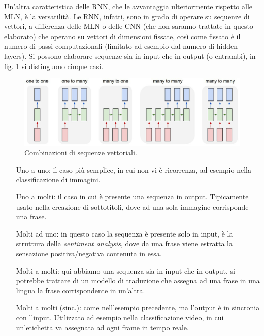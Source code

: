 Un'altra caratteristica delle RNN, che le avvantaggia ulteriormente rispetto alle MLN, è la versatilità. Le RNN, infatti, sono in grado di operare su sequenze di vettori, a differenza delle MLN o delle CNN (che non saranno trattate in questo elaborato) che operano su vettori di dimensioni fissate, così come fissato è il numero di passi computazionali (limitato ad esempio dal numero di hidden layers). Si possono elaborare sequenze sia in input che in output (o entrambi), in fig. \ref{fig:1.7} si distinguono cinque casi.
\newpage
\begin{figure}[ht]
	\centering
	\includegraphics{img/rnn_seq.jpg}
	\caption{Combinazioni di sequenze vettoriali. \cite{rnn_effect}}
	\label{fig:1.7}
\end{figure}

\begin{enumerate}
	\label{enum:recurrence}
	\item[Uno a uno:] il caso più semplice, in cui non vi è ricorrenza, ad esempio nella classificazione di immagini.
	\item[Uno a molti:] il caso in cui è presente una sequenza in output. Tipicamente usato nella creazione di sottotitoli, dove ad una sola immagine corrisponde una frase.
	\item[Molti ad uno:] in questo caso la sequenza è presente solo in input, è la struttura della \textit{sentiment analysis}, dove da una frase viene estratta la sensazione positiva/negativa contenuta in essa.
	\item[Molti a molti:] qui abbiamo una sequenza sia in input che in output, si potrebbe trattare di un modello di traduzione che assegna ad una frase in una lingua la frase corrispondente in un'altra.
	\item[Molti a molti (sinc.):] come nell'esempio precedente, ma l'output è in sincronia con l'input. Utilizzato ad esempio nella classificazione video, in cui un'etichetta va assegnata ad ogni frame in tempo reale.
\end{enumerate}
